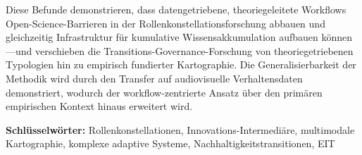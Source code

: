 \documentclass[../main.tex]{subfiles}
\begin{document}
Diese Befunde demonstrieren, dass datengetriebene, theoriegeleitete Workflows Open-Science-Barrieren in der Rollenkonstellationsforschung abbauen und gleichzeitig Infrastruktur für kumulative Wissensakkumulation aufbauen können---und verschieben die Transitions-Governance-Forschung von theoriegetriebenen Typologien hin zu empirisch fundierter Kartographie. Die Generalisierbarkeit der Methodik wird durch den Transfer auf audiovisuelle Verhaltensdaten demonstriert, wodurch der workflow-zentrierte Ansatz über den primären empirischen Kontext hinaus erweitert wird.

\textbf{Schlüsselwörter:} Rollenkonstellationen, Innovations-Intermediäre, multimodale Kartographie, komplexe adaptive Systeme, Nachhaltigkeitstransitionen, EIT
\end{document}
